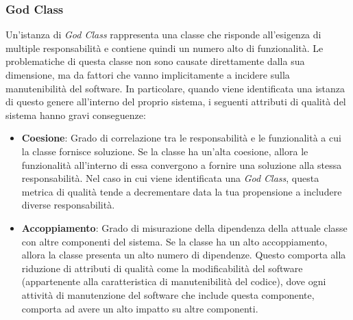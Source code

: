 \subsubsection{God Class}
Un'istanza di \textit{God Class} rappresenta una classe che risponde all'esigenza di multiple responsabilità e contiene quindi un numero alto di funzionalità.
Le problematiche di questa classe non sono causate direttamente dalla sua dimensione, ma da fattori che vanno implicitamente a incidere sulla manutenibilità del software. In particolare, quando viene identificata una istanza di questo genere all'interno del proprio sistema, i seguenti attributi di qualità del sistema hanno gravi conseguenze:
\begin{itemize}
    \item \textbf{Coesione}: Grado di correlazione tra le responsabilità e le funzionalità a cui la classe fornisce soluzione. Se la classe ha un'alta coesione, allora le funzionalità all'interno di essa convergono a fornire una soluzione alla stessa responsabilità. Nel caso in cui viene identificata una \textit{God Class}, questa metrica di qualità tende a decrementare data la tua propensione a includere diverse responsabilità.
    \item \textbf{Accoppiamento}: Grado di misurazione della dipendenza della attuale classe con altre componenti del sistema. Se la classe ha un alto accoppiamento, allora la classe presenta un alto numero di dipendenze. Questo comporta alla riduzione di attributi di qualità come la modificabilità del software (appartenente alla caratteristica di manutenibilità del codice), dove ogni attività di manutenzione del software che include questa componente, comporta ad avere un alto impatto su altre componenti.
\end{itemize}


